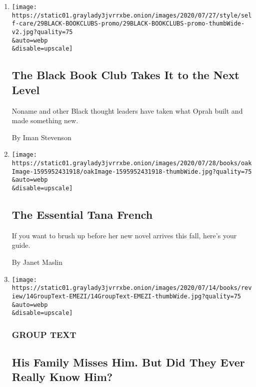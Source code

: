 \begin{enumerate}
\def\labelenumi{\arabic{enumi}.}
\item
  \href{/2020/07/29/style/self-care/black-book-clubs.html}{}

  \texttt{[image: https://static01.graylady3jvrrxbe.onion/images/2020/07/27/style/self-care/29BLACK-BOOKCLUBS-promo/29BLACK-BOOKCLUBS-promo-thumbWide-v2.jpg?quality=75\\\&auto=webp\\\&disable=upscale]}

  \hypertarget{the-black-book-club-takes-it-to-the-next-level}{%
  \subsection{The Black Book Club Takes It to the Next
  Level}\label{the-black-book-club-takes-it-to-the-next-level}}

  Noname and other Black thought leaders have taken what Oprah built and
  made something new.

  By Iman Stevenson
\item
  \href{/2020/07/29/books/the-essential-tana-french.html}{}

  \texttt{[image: https://static01.graylady3jvrrxbe.onion/images/2020/07/28/books/oakImage-1595952431918/oakImage-1595952431918-thumbWide.jpg?quality=75\\\&auto=webp\\\&disable=upscale]}

  \hypertarget{the-essential-tana-french}{%
  \subsection{The Essential Tana
  French}\label{the-essential-tana-french}}

  If you want to brush up before her new novel arrives this fall, here's
  your guide.

  By Janet Maslin
\item
  \href{/2020/07/28/books/death-vivek-oji-akwaeke-emezi-group-text.html}{}

  \texttt{[image: https://static01.graylady3jvrrxbe.onion/images/2020/07/14/books/review/14GroupText-EMEZI/14GroupText-EMEZI-thumbWide.jpg?quality=75\\\&auto=webp\\\&disable=upscale]}

  \hypertarget{group-text}{%
  \subsubsection{GROUP TEXT}\label{group-text}}

  \hypertarget{his-family-misses-him-but-did-they-ever-really-know-him}{%
  \subsection{His Family Misses Him. But Did They Ever Really Know
  Him?}\label{his-family-misses-him-but-did-they-ever-really-know-him}}


\end{enumerate}
